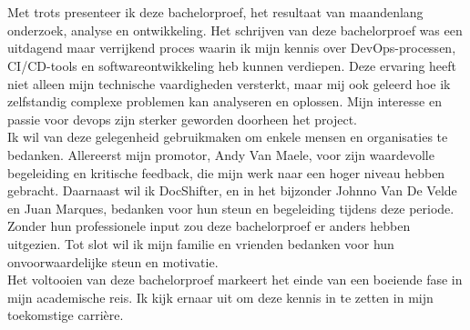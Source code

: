 
\chapter*{}%
\label{ch:voorwoord}

Met trots presenteer ik deze bachelorproef, het resultaat van maandenlang onderzoek, analyse en ontwikkeling. Het schrijven van deze bachelorproef was een uitdagend maar verrijkend proces waarin ik mijn kennis over DevOps-processen, CI/CD-tools en softwareontwikkeling heb kunnen verdiepen. Deze ervaring heeft niet alleen mijn technische vaardigheden versterkt, maar mij ook geleerd hoe ik zelfstandig complexe problemen kan analyseren en oplossen. Mijn interesse en passie voor devops zijn sterker geworden doorheen het project. \\

Ik wil van deze gelegenheid gebruikmaken om enkele mensen en organisaties te bedanken. Allereerst mijn promotor, Andy Van Maele, voor zijn waardevolle begeleiding en kritische feedback, die mijn werk naar een hoger niveau hebben gebracht. Daarnaast wil ik DocShifter, en in het bijzonder Johnno Van De Velde en Juan Marques, bedanken voor hun steun en begeleiding tijdens deze periode. Zonder hun professionele input zou deze bachelorproef er anders hebben uitgezien. Tot slot wil ik mijn familie en vrienden bedanken voor hun onvoorwaardelijke steun en motivatie. \\

Het voltooien van deze bachelorproef markeert het einde van een boeiende fase in mijn academische reis. Ik kijk ernaar uit om deze kennis in te zetten in mijn toekomstige carrière.

